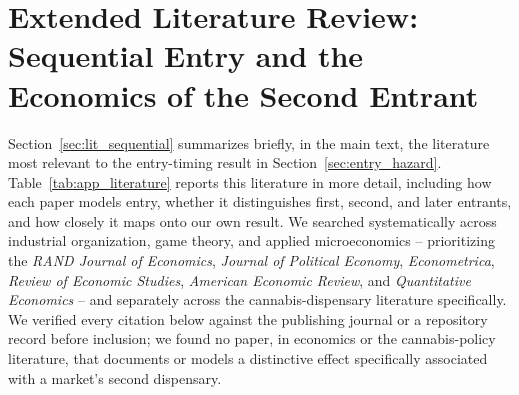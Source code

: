 \documentclass[12pt]{article}
\begin{document}
\appendix
\section{Extended Literature Review: Sequential Entry and the Economics of the Second Entrant}
\label{app:literature}

Section~\ref{sec:lit_sequential} summarizes briefly, in the main text, the literature most relevant to the
entry-timing result in Section~\ref{sec:entry_hazard}. Table~\ref{tab:app_literature} reports this
literature in more detail, including how each paper models entry, whether it distinguishes first, second,
and later entrants, and how closely it maps onto our own result. We searched systematically across
industrial organization, game theory, and applied microeconomics -- prioritizing the \textit{RAND Journal of
Economics}, \textit{Journal of Political Economy}, \textit{Econometrica}, \textit{Review of Economic
Studies}, \textit{American Economic Review}, and \textit{Quantitative Economics} -- and separately across
the cannabis-dispensary literature specifically. We verified every citation below against the publishing
journal or a repository record before inclusion; we found no paper, in economics or the cannabis-policy
literature, that documents or models a distinctive effect specifically associated with a market's second
dispensary.
\end{document}
